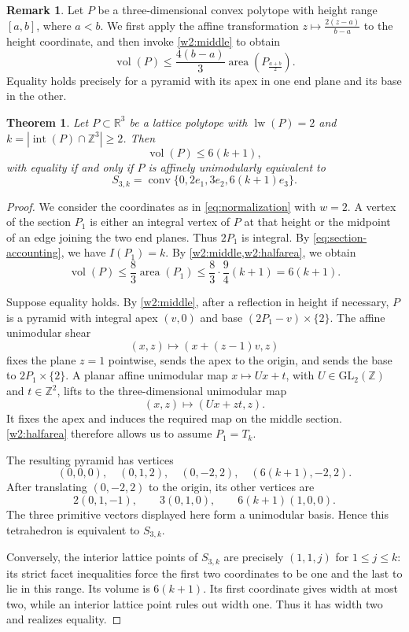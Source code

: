 \documentclass[reqno, 11pt]{article}
\numberwithin{equation}{section}
\newtheorem{theorem}{Theorem}[section]
\theoremstyle{definition}
\newtheorem{remark}[remark]{Remark}
\newcommand{\R}{\mathbb R}
\newcommand{\Z}{\mathbb Z}
\DeclareMathOperator{\Int}{int}
\DeclareMathOperator{\vol}{vol}
\DeclareMathOperator{\area}{area}
\DeclareMathOperator{\lw}{lw}
\DeclareMathOperator{\conv}{conv}
\numberwithin{equation}{section}
\begin{document}
\begin{remark}\label{rem:midareatovol}
Let $P$ be a three-dimensional convex polytope with height range $[a,b]$, where $a<b$. We first apply the affine transformation $z\mapsto\frac{2(z-a)}{b-a}$ to the height coordinate, and then invoke \cref{w2:middle} to obtain
\begin{equation}\label{w2:rescaled-middle}
 \vol(P)\le\frac{4(b-a)}{3}\area\left(P_{\frac{a+b}{2}}\right).
\end{equation}
Equality holds precisely for a pyramid with its apex in one end plane
and its base in the other.
\end{remark}

\begin{theorem}\label{w2:theorem}
Let $P\subset\R^3$ be a lattice polytope with $\lw(P)=2$ and $k=|\Int(P)\cap\Z^3|\ge2$.  Then
\[
 \vol(P)\le6(k+1),
\]
with equality if and only if $P$ is affinely unimodularly equivalent to
\[
 S_{3,k}=\conv\{0,2e_1,3e_2,6(k+1)e_3\}.
\]
\end{theorem}
\begin{proof}
We consider the coordinates as in \eqref{eq:normalization} with $w=2$.
A vertex of the section $P_1$ is either an integral vertex of $P$ at that height or the midpoint of an edge joining the two end planes.  Thus $2P_1$ is integral. By \eqref{eq:section-accounting}, we have $I(P_1)=k$.
By \cref{w2:middle,w2:halfarea}, we obtain 
\[
 \vol(P)\le\frac83\area(P_1) \le\frac83\cdot \frac94(k+1)=6(k+1).
\]

Suppose equality holds.  By \cref{w2:middle}, after a reflection in height if necessary, $P$ is a pyramid with integral apex $(v,0)$
and base $(2P_1-v)\times\{2\}$.  The affine unimodular shear
\[
 (x,z)\longmapsto(x+(z-1)v,z)
\]
fixes the plane $z=1$ pointwise, sends the apex to the origin, and sends the base to $2P_1\times\{2\}$.  A planar affine unimodular map $x\mapsto Ux+t$, with $U\in\mathrm{GL}_2(\Z)$ and $t\in\Z^2$, lifts to the three-dimensional unimodular map
\[
 (x,z)\longmapsto(Ux+zt,z).
\]
It fixes the apex and induces the required map on the middle section. \cref{w2:halfarea} therefore allows us to assume $P_1=T_k$.

The resulting pyramid has vertices
\[
 (0,0,0),\quad(0,1,2),\quad(0,-2,2),\quad(6(k+1),-2,2).
\]
After translating $(0,-2,2)$ to the origin, its other vertices are
\[
 2(0,1,-1),\qquad3(0,1,0),\qquad6(k+1)(1,0,0).
\]
The three primitive vectors displayed here form a unimodular basis.
Hence this tetrahedron is equivalent to $S_{3,k}$.

Conversely, the interior lattice points of $S_{3,k}$ are precisely $(1,1,j)$ for $1\le j\le k$: its strict facet inequalities force the first two coordinates to be one and the last to lie in this range.
Its volume is $6(k+1)$.  Its first coordinate gives width at most two, while an interior lattice point rules out width one.  Thus it
has width two and realizes equality.
\end{proof}
\end{document}
